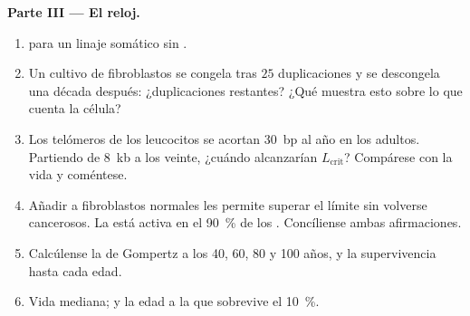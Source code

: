 \begin{problem}
\medskip
\noindent\textbf{Parte III --- El reloj.}
\begin{enumerate}[resume]
  \item {} para un linaje somático sin .
  \item Un cultivo de fibroblastos se congela tras $25$ duplicaciones y
        se descongela una década después: ¿duplicaciones restantes? ¿Qué
        muestra esto sobre lo que cuenta la célula?
  \item Los telómeros de los leucocitos se acortan \qty{30}{bp} al año
        en los adultos. Partiendo de \qty{8}{kb} a los veinte, ¿cuándo
        alcanzarían $L_{\text{crit}}$? Compárese con la vida y
        coméntese.
  \item Añadir  a fibroblastos normales les permite superar el
        límite sin volverse cancerosos. La  está activa en el
        \qty{90}{\%} de los . Concíliense ambas afirmaciones.
  \item Calcúlense la  de Gompertz a los 40, 60, 80 y
        100 años, y la supervivencia hasta cada edad.
  \item Vida mediana; y la edad a la que sobrevive el \qty{10}{\%}.
\end{enumerate}


\end{problem}
